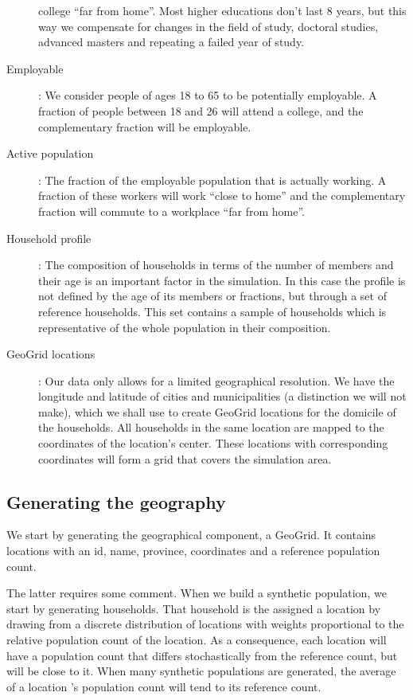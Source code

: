 \begin{description}
        college ``far from home''. Most higher educations don't last 8 years, but this way we compensate 
        for changes in the field of study, doctoral studies, advanced masters and repeating a failed year of study.
    \item[Employable]:
        We consider people of ages 18 to 65 to be potentially employable. A fraction of people between 18 and 26 
        will attend a college, and the complementary fraction will be employable.
    \item[Active population]:
        The fraction of the employable population that is actually working. A fraction of these workers will 
        work ``close to home'' and the complementary fraction will commute to a workplace ``far from home''.
    \item[Household profile]:
        The composition of households in terms of the number of members and their age is an important 
        factor in the simulation. In this case the profile is not defined by the age of its members or fractions, 
        but through a set of reference households. This set contains a sample of households which is 
        representative of the whole population in their composition.
    \item[GeoGrid locations]:
        Our data only allows for a limited geographical resolution. We have the longitude and latitude of cities 
        and municipalities (a distinction we will not make), which we shall use to create GeoGrid locations for 
        the domicile of the households. All households in the same location are mapped to the coordinates 
        of the location's center. These locations with corresponding coordinates will form a grid that covers 
        the simulation area.
\end{description}

\subsection{Generating the geography}
\label{subsection:gengeo}
We start by generating the geographical component, a GeoGrid.
It contains locations with an id, name, province, coordinates and a reference population count.

The latter requires some comment. When we build a synthetic population, we start by generating households. That household is the assigned a location by drawing from a discrete distribution of locations with weights proportional to the  relative population count of the location. As a consequence, each location will have a population count that differs stochastically from the reference count, but will be close to it. When many synthetic populations are generated, the average of a location 's population count will tend to its reference count.

